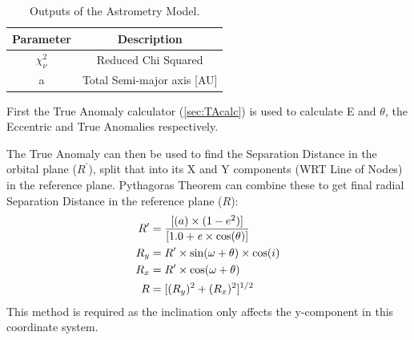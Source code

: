 \documentclass[12pt,preprint]{aastex}
\begin{document}
\begin{table}[h]
\centering
\caption{ Outputs of the Astrometry Model.}
\begin{tabular}{c c}
\hline\hline
Parameter & Description \\
\hline
$\chi^{2}_{\nu}$ & Reduced Chi Squared \\
a & Total Semi-major axis [AU]  \\
\hline
\end{tabular}
\end{table}

\pagebreak

First the True Anomaly calculator (\ref{sec:TAcalc}) is used to calculate E and $\theta$, the Eccentric and True Anomalies respectively.

The True Anomaly can then be used to find the Separation Distance in the orbital plane ($R^{\prime}$), split that into its X and Y components (WRT Line of Nodes) in the reference plane.  Pythagoras Theorem can combine these to get final radial Separation Distance in the reference plane ($R$):
\begin{subequations}
\begin{align}
\label{eq:4.1.6a}
R^{\prime}& = \frac{[(a)\times(1-e^{2})]}{[1.0 +{\it e}\times \cos(\theta)]}\\
\label{eq:4.1.6b}
R_y& = R^{\prime} \times \sin(\omega + \theta) \times \cos(i)\\
\label{eq:4.1.6c}
R_x& = R^{\prime} \times \cos(\omega + \theta)\\
\label{eq:4.1.6d}
R& = [(R_y)^{2} + (R_x)^{2}]^{1/2}
\end{align}
\end{subequations}
This method is required as the inclination only affects the y-component in this coordinate system.
\end{document}
